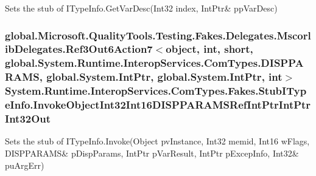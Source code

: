 Sets the stub of I\-Type\-Info.\-Get\-Var\-Desc(Int32 index, Int\-Ptr\& pp\-Var\-Desc)

\hypertarget{class_system_1_1_runtime_1_1_interop_services_1_1_com_types_1_1_fakes_1_1_stub_i_type_info_a0e7e629cb8e8c9f791c888e1d240e27e}{
\subsubsection[{Invoke\-Object\-Int32\-Int16\-D\-I\-S\-P\-P\-A\-R\-A\-M\-S\-Ref\-Int\-Ptr\-Int\-Ptr\-Int32\-Out}]{\setlength{\rightskip}{0pt plus 5cm}global.\-Microsoft.\-Quality\-Tools.\-Testing.\-Fakes.\-Delegates.\-Mscorlib\-Delegates.\-Ref3\-Out6\-Action7$<$object, int, short, global.\-System.\-Runtime.\-Interop\-Services.\-Com\-Types.\-D\-I\-S\-P\-P\-A\-R\-A\-M\-S, global.\-System.\-Int\-Ptr, global.\-System.\-Int\-Ptr, int$>$ System.\-Runtime.\-Interop\-Services.\-Com\-Types.\-Fakes.\-Stub\-I\-Type\-Info.\-Invoke\-Object\-Int32\-Int16\-D\-I\-S\-P\-P\-A\-R\-A\-M\-S\-Ref\-Int\-Ptr\-Int\-Ptr\-Int32\-Out}}\label{class_system_1_1_runtime_1_1_interop_services_1_1_com_types_1_1_fakes_1_1_stub_i_type_info_a0e7e629cb8e8c9f791c888e1d240e27e}


Sets the stub of I\-Type\-Info.\-Invoke(Object pv\-Instance, Int32 memid, Int16 w\-Flags, D\-I\-S\-P\-P\-A\-R\-A\-M\-S\& p\-Disp\-Params, Int\-Ptr p\-Var\-Result, Int\-Ptr p\-Excep\-Info, Int32\& pu\-Arg\-Err)

